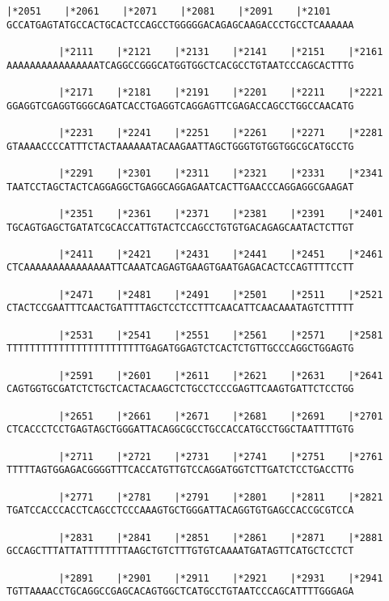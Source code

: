 \documentclass{article}
\begin{document}
\newpage
\begin{Verbatim}[fontfamily=courier]
         |*2051    |*2061    |*2071    |*2081    |*2091    |*2101
GCCATGAGTATGCCACTGCACTCCAGCCTGGGGGACAGAGCAAGACCCTGCCTCAAAAAA

         |*2111    |*2121    |*2131    |*2141    |*2151    |*2161
AAAAAAAAAAAAAAAATCAGGCCGGGCATGGTGGCTCACGCCTGTAATCCCAGCACTTTG

         |*2171    |*2181    |*2191    |*2201    |*2211    |*2221
GGAGGTCGAGGTGGGCAGATCACCTGAGGTCAGGAGTTCGAGACCAGCCTGGCCAACATG

         |*2231    |*2241    |*2251    |*2261    |*2271    |*2281
GTAAAACCCCATTTCTACTAAAAAATACAAGAATTAGCTGGGTGTGGTGGCGCATGCCTG

         |*2291    |*2301    |*2311    |*2321    |*2331    |*2341
TAATCCTAGCTACTCAGGAGGCTGAGGCAGGAGAATCACTTGAACCCAGGAGGCGAAGAT

         |*2351    |*2361    |*2371    |*2381    |*2391    |*2401
TGCAGTGAGCTGATATCGCACCATTGTACTCCAGCCTGTGTGACAGAGCAATACTCTTGT

         |*2411    |*2421    |*2431    |*2441    |*2451    |*2461
CTCAAAAAAAAAAAAAAATTCAAATCAGAGTGAAGTGAATGAGACACTCCAGTTTTCCTT

         |*2471    |*2481    |*2491    |*2501    |*2511    |*2521
CTACTCCGAATTTCAACTGATTTTAGCTCCTCCTTTCAACATTCAACAAATAGTCTTTTT

         |*2531    |*2541    |*2551    |*2561    |*2571    |*2581
TTTTTTTTTTTTTTTTTTTTTTTTGAGATGGAGTCTCACTCTGTTGCCCAGGCTGGAGTG

         |*2591    |*2601    |*2611    |*2621    |*2631    |*2641
CAGTGGTGCGATCTCTGCTCACTACAAGCTCTGCCTCCCGAGTTCAAGTGATTCTCCTGG

         |*2651    |*2661    |*2671    |*2681    |*2691    |*2701
CTCACCCTCCTGAGTAGCTGGGATTACAGGCGCCTGCCACCATGCCTGGCTAATTTTGTG

         |*2711    |*2721    |*2731    |*2741    |*2751    |*2761
TTTTTAGTGGAGACGGGGTTTCACCATGTTGTCCAGGATGGTCTTGATCTCCTGACCTTG

         |*2771    |*2781    |*2791    |*2801    |*2811    |*2821
TGATCCACCCACCTCAGCCTCCCAAAGTGCTGGGATTACAGGTGTGAGCCACCGCGTCCA

         |*2831    |*2841    |*2851    |*2861    |*2871    |*2881
GCCAGCTTTATTATTTTTTTTAAGCTGTCTTTGTGTCAAAATGATAGTTCATGCTCCTCT

         |*2891    |*2901    |*2911    |*2921    |*2931    |*2941
TGTTAAAACCTGCAGGCCGAGCACAGTGGCTCATGCCTGTAATCCCAGCATTTTGGGAGA

\end{Verbatim}
\end{document}
